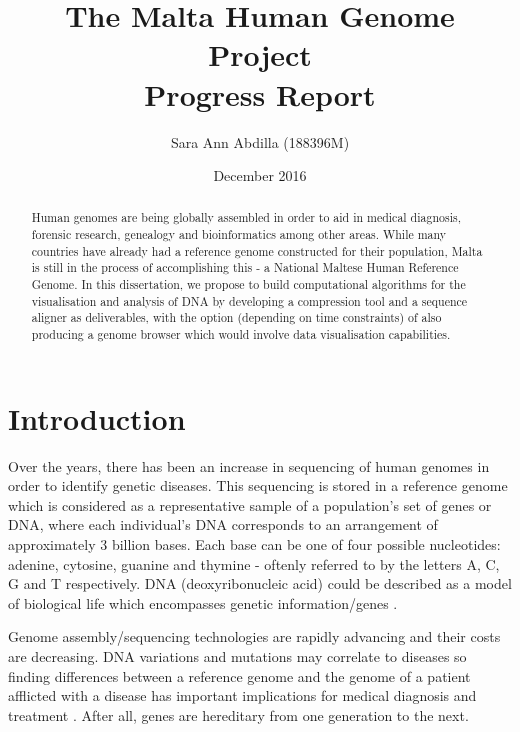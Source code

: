 \documentclass{csfyp}
\title{The Malta Human Genome Project \\
  \large Progress Report}
\author{Sara Ann Abdilla (188396M)}
\date{December 2016}
\begin{document}
\tableofcontents
\newpage
\listoffigures

\newpage

\setcounter{page}{1}


\begin{abstract}
Human genomes are being globally assembled in order to aid in medical diagnosis, forensic research, genealogy and bioinformatics among other areas.  While many countries have already had a reference genome constructed for their population, Malta is still in the process of accomplishing this - a National Maltese Human Reference Genome.  In this dissertation, we propose to build computational algorithms for the visualisation and analysis of DNA by developing a compression tool and a sequence aligner as deliverables, with the option (depending on time constraints) of also producing a genome browser which would involve data visualisation capabilities.
\end{abstract}


\section{Introduction}\vspace{-2ex}
\label{s:intro}

Over the years, there has been an increase in sequencing of human genomes in order to identify genetic diseases.  This sequencing is stored in a reference genome which is considered as a representative sample of a population's set of genes or DNA, where each individual's DNA corresponds to an arrangement of approximately 3 billion bases.  Each base can be one of four possible nucleotides: adenine, cytosine, guanine and thymine - oftenly referred to by the letters A, C, G and T respectively.  DNA (deoxyribonucleic acid) could be described as a model of biological life which encompasses genetic information/genes \cite{aiBk, introgenom}.  

Genome assembly/sequencing technologies are rapidly advancing and their costs are decreasing.  DNA variations and mutations may correlate to diseases so finding differences between a reference genome and the genome of a patient afflicted with a disease has important implications for medical diagnosis and treatment \cite{think}.  After all, genes are hereditary from one generation to the next.
\end{document}

